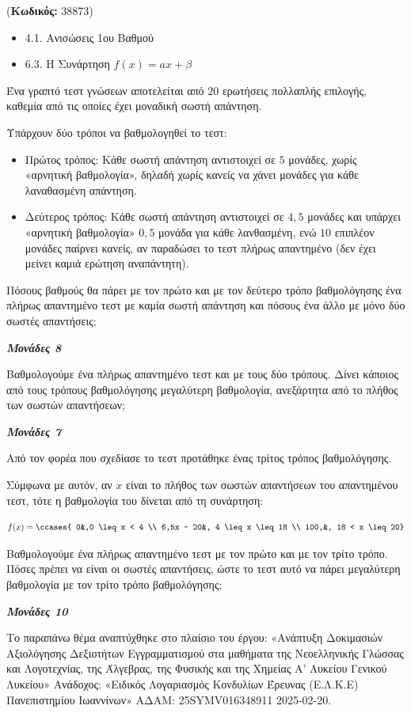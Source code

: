 \documentclass[11pt,a4paper,twoside]{book}
\newcounter{askhsh}[chapter]
\renewcommand{\theaskhsh}{
	\bf{\titlefont{\Large{\thechapter}}.\arabic{askhsh}}
}
\newcommand{\Askhsh}[2]{\refstepcounter{askhsh}{\titlefont{Άσκηση\theaskhsh} - \textcolor{maincolor}{ΘΕΜΑ #2}} ({\small{\textbf{Κωδικός:} #1}})\\}{}
\newenvironment{ylh}{
\begin{tcolorbox}[
breakable,
enhanced standard,
titlerule=0pt,
toprule=0pt, 
rightrule=0pt, 
bottomrule=0pt,
title={\titlefont Ύλη άσκησης},
colback=white,
opacityback=0,
left=2mm,
top=1mm,
bottom=0mm,
boxrule=0pt,
colframe=white,
borderline west={1.5mm}{0pt}{secondarycolor},
leftrule=2mm,
sharp corners,
coltitle=black
]
\begin{itemize}[leftmargin=3mm, itemsep=0mm, label=\textcolor{secondarycolor}{{\small\faBook}}]
}{
\end{itemize}
\end{tcolorbox}
}
\newcommand{\monades}[1]{
\hspace*{\fill}
\textbf{\textit{\textcolor{maincolor}{Μονάδες #1}}}}
\begin{document}
\vspace{4mm}
\Askhsh{38873}{4}
\begin{ylh}
    \item 4.1. Ανισώσεις 1ου Βαθμού
    \item 6.3. Η Συνάρτηση $f(x)=ax+\beta$
\end{ylh}

Ένα γραπτό τεστ γνώσεων αποτελείται από $20$ ερωτήσεις πολλαπλής επιλογής, καθεμία από τις οποίες έχει μοναδική σωστή απάντηση.

Υπάρχουν δύο τρόποι να βαθμολογηθεί το τεστ:

\begin{itemize}
\item
  Πρώτος τρόπος: Κάθε σωστή απάντηση αντιστοιχεί σε $5$ μονάδες, χωρίς «αρνητική βαθμολογία», δηλαδή χωρίς κανείς να χάνει μονάδες για κάθε λαναθασμένη απάντηση.
\item
  Δεύτερος τρόπος: Κάθε σωστή απάντηση αντιστοιχεί σε $4,5$ μονάδες και υπάρχει «αρνητική βαθμολογία» $0,5$ μονάδα για κάθε λανθασμένη, ενώ $10$ επιπλέον μονάδες παίρνει κανείς, αν παραδώσει το τεστ πλήρως απαντημένο (δεν έχει μείνει καμιά ερώτηση αναπάντητη).
\end{itemize}

\begin{alist}
\item Πόσους βαθμούς θα πάρει με τον πρώτο και με τον δεύτερο τρόπο βαθμολόγησης ένα πλήρως απαντημένο τεστ με καμία σωστή απάντηση και πόσους ένα άλλο με μόνο δύο σωστές απαντήσεις;
\monades{8}
\item Βαθμολογούμε ένα πλήρως απαντημένο τεστ και με τους δύο τρόπους. Δίνει κάποιος από τους τρόπους βαθμολόγησης μεγαλύτερη βαθμολογία, ανεξάρτητα από το πλήθος των σωστών απαντήσεων;
\monades{7}
\item Από τον φορέα που σχεδίασε το τεστ προτάθηκε ένας τρίτος τρόπος βαθμολόγησης.

Σύμφωνα με αυτόν, αν $x$ είναι το πλήθος των σωστών απαντήσεων του απαντημένου τεστ, τότε η βαθμολογία του δίνεται από τη συνάρτηση:

\begin{equation*}f(x) = \ccases{
0&,0 \leq x < 4 \\
6,5x - 20&, 4 \leq x \leq 18 \\
100,&, 18 < x \leq 20}
\end{equation*}

Βαθμολογούμε ένα πλήρως απαντημένο τεστ με τον πρώτο και με τον τρίτο τρόπο. Πόσες πρέπει να είναι οι σωστές απαντήσεις, ώστε το τεστ αυτό να πάρει μεγαλύτερη βαθμολογία με τον τρίτο τρόπο βαθμολόγησης;

\monades{10}

{\footnotesize Το παραπάνω θέμα αναπτύχθηκε στο πλαίσιο του έργου: «Ανάπτυξη Δοκιμασιών Αξιολόγησης Δεξιοτήτων Εγγραμματισμού στα μαθήματα της Νεοελληνικής Γλώσσας και Λογοτεχνίας, της Άλγεβρας, της Φυσικής και της Χημείας Α' Λυκείου Γενικού Λυκείου» Ανάδοχος: «Ειδικός Λογαριασμός Κονδυλίων Έρευνας (Ε.Λ.Κ.Ε) Πανεπιστημίου Ιωαννίνων» ΑΔΑΜ: 25SYMV016348911 2025-02-20.}
\end{alist}
\end{document}
